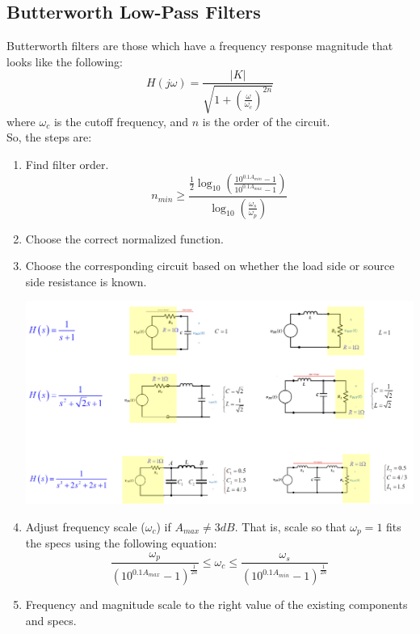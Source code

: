 \documentclass[nobib]{tufte-handout}
\begin{document}
\subsection{Butterworth Low-Pass Filters}
Butterworth filters are those which have a frequency response magnitude that
looks like the following:
\begin{equation*}
    H(j\omega) = \frac{|K|}{\sqrt{1+\left(\frac{\omega}{\omega_c}\right)^{2n}}}
\end{equation*}
where $\omega_c$ is the cutoff frequency, and $n$ is the order of the circuit.\\
So, the steps are:
\begin{enumerate}
    \item Find filter order.
          \begin{equation*}
              n_{min} \geq \frac{\frac{1}{2}\log_{10}\left(\frac{10^{0.1A_{min}}-1}{10^{0.1A_{max}}-1}\right)}{\log_{10}\left(\frac{\omega_s}{\omega_p}\right)}
          \end{equation*}
    \item Choose the correct normalized function.
    \item Choose the corresponding circuit based on whether the load side or source side
          resistance is known.
          \begin{center}
              \includegraphics[width = \textwidth]{images/standard_butterworth.png}
          \end{center}
    \item Adjust frequency scale ($\omega_c$) if $A_{max}\neq 3dB$. That is, scale so
          that $\omega_p = 1$ fits the specs using the following equation:\\
          \begin{equation*}
              \frac{\omega_p}{(10^{0.1A_{max}}-1)^{\frac{1}{2n}}} \leq \omega_c \leq \frac{\omega_s}{(10^{0.1A_{min}}-1)^{\frac{1}{2n}}}
          \end{equation*}
    \item Frequency and magnitude scale to the right value of the existing components and
          specs.
\end{enumerate}
\end{document}

